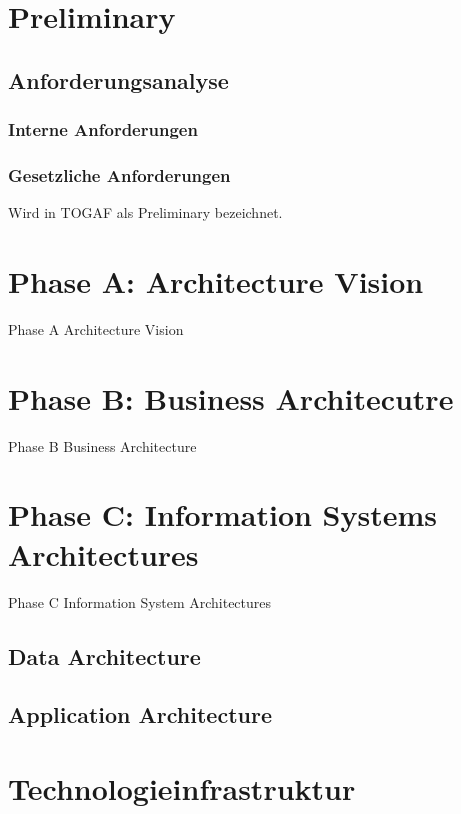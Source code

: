 \section{Preliminary}
\subsection{Anforderungsanalyse}
\subsubsection{Interne Anforderungen}
\subsubsection{Gesetzliche Anforderungen}

Wird in TOGAF als Preliminary bezeichnet.

\section{Phase A: Architecture Vision}
Phase A Architecture Vision
\section{Phase B: Business Architecutre}
Phase B Business Architecture

\section{Phase C: Information Systems Architectures}
Phase C Information System Architectures

\subsection{Data Architecture}

\subsection{Application Architecture}

\section{Technologieinfrastruktur}